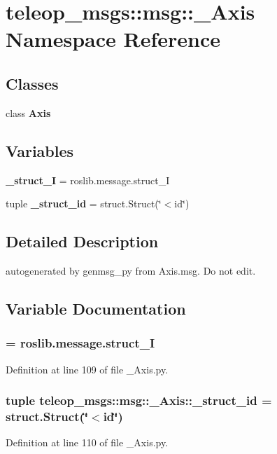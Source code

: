 \section{teleop\_\-msgs::msg::\_\-Axis Namespace Reference}
\label{namespaceteleop__msgs_1_1msg_1_1__Axis}
\subsection*{Classes}
\begin{DoxyCompactItemize}
\item 
class {\bf Axis}
\end{DoxyCompactItemize}
\subsection*{Variables}
\begin{DoxyCompactItemize}
\item 
{\bf \_\-struct\_\-I} = roslib.message.struct\_\-I
\item 
tuple {\bf \_\-struct\_\-id} = struct.Struct(\char`\"{}$<$id\char`\"{})
\end{DoxyCompactItemize}


\subsection{Detailed Description}
\begin{DoxyVerb}autogenerated by genmsg_py from Axis.msg. Do not edit.\end{DoxyVerb}
 

\subsection{Variable Documentation}
\subsubsection[{\_\-struct\_\-I}]{ = roslib.message.struct\_\-I}\label{namespaceteleop__msgs_1_1msg_1_1__Axis_a9feaaad2b89dbad98324c8aa33daf897}


Definition at line 109 of file \_\-Axis.py.

\subsubsection[{\_\-struct\_\-id}]{\setlength{\rightskip}{0pt plus 5cm}tuple {\bf teleop\_\-msgs::msg::\_\-Axis::\_\-struct\_\-id} = struct.Struct(\char`\"{}$<$id\char`\"{})}\label{namespaceteleop__msgs_1_1msg_1_1__Axis_a1ce85255bd8d2a8e929678822c534b68}


Definition at line 110 of file \_\-Axis.py.

